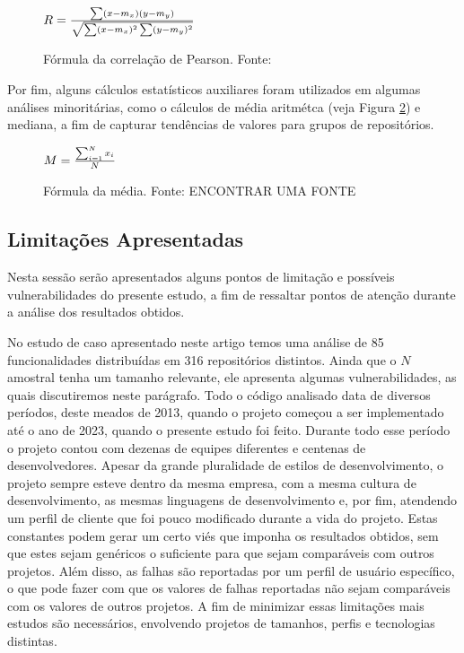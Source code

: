 \documentclass[11.5pt]{article}
\begin{document}
\begin{figure}[ht]
\caption{Fórmula da correlação de Pearson. Fonte: \cite{scipy}}
\label{fig:formulaCorrelacao}
\begin{center}
    $R = {\sum(x - m_x)(y - m_y) \over \sqrt{\sum(x - m_x)^2 \sum(y - m_y)^2}}$
\end{center}
\end{figure}

Por fim, alguns cálculos estatísticos auxiliares foram utilizados em algumas análises minoritárias,
como o cálculos de média aritmétca (veja Figura \ref{fig:formulaMedia}) e mediana, a fim de capturar
tendências de valores para grupos de repositórios.

\begin{figure}[ht]
\caption{Fórmula da média. Fonte: ENCONTRAR UMA FONTE}
\label{fig:formulaMedia}
\begin{center}
    $M = {\sum_{i=1}^{N} x_i \over N}$
\end{center}
\end{figure}


\subsection{Limitações Apresentadas}

Nesta sessão serão apresentados alguns pontos de limitação e possíveis vulnerabilidades do presente
estudo, a fim de ressaltar pontos de atenção durante a análise dos resultados obtidos.

No estudo de caso apresentado neste artigo temos uma análise de 85 funcionalidades distribuídas em
316 repositórios distintos.
Ainda que o $N$ amostral tenha um tamanho relevante, ele apresenta algumas vulnerabilidades, as
quais discutiremos neste parágrafo.
Todo o código analisado data de diversos períodos, deste meados de 2013, quando o projeto começou a
ser implementado até o ano de 2023, quando o presente estudo foi feito.
Durante todo esse período o projeto contou com dezenas de equipes diferentes e centenas de
desenvolvedores.
Apesar da grande pluralidade de estilos de desenvolvimento, o projeto sempre esteve dentro da mesma
empresa, com a mesma cultura de desenvolvimento, as mesmas linguagens de desenvolvimento e, por fim,
atendendo um perfil de cliente que foi pouco modificado durante a vida do projeto.
Estas constantes podem gerar um certo viés que imponha os resultados obtidos, sem que estes sejam
genéricos o suficiente para que sejam comparáveis com outros projetos.
Além disso, as falhas são reportadas por um perfil de usuário específico, o que pode fazer com que
os valores de falhas reportadas não sejam comparáveis com os valores de outros projetos.
A fim de minimizar essas limitações mais estudos são necessários, envolvendo projetos de tamanhos,
perfis e tecnologias distintas.
\end{document}
